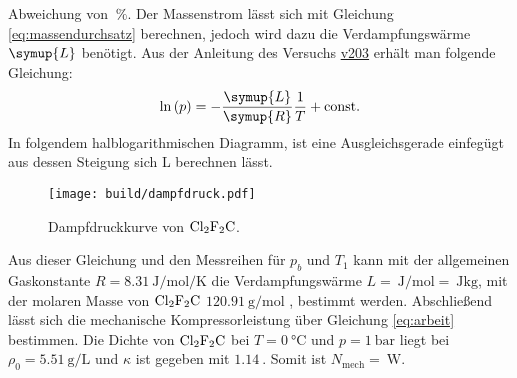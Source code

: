 Abweichung von $\SI{}{\percent}$.
%
Der Massenstrom lässt sich mit Gleichung \eqref{eq:massendurchsatz} berechnen, jedoch wird dazu die Verdampfungswärme 
$\symup{L}$ benötigt.
Aus der Anleitung des Versuchs \href{http://129.217.224.2/HOMEPAGE/PHYSIKER/BACHELOR/AP/SKRIPT/V203.pdf}{v203} erhält man 
folgende Gleichung:
\begin{equation}
    \ln \left(p\right) = -\frac{\symup{L}}{\symup{R}} \frac{1}{T} + \text{const.}
\end{equation}
In folgendem halblogarithmischen Diagramm, ist eine Ausgleichsgerade einfegügt aus dessen Steigung sich L berechnen lässt.
\begin{figure}[H]
\centering
\texttt{[image: build/dampfdruck.pdf]}
\caption{Dampfdruckkurve von $\ce{Cl2F2C}$.}
\end{figure}
%
Aus dieser Gleichung und den Messreihen für $p_b$ und $T_1$ kann mit der allgemeinen Gaskonstante $R=\SI{8.31}{\joule\per\mole\per\kelvin}$
die Verdampfungswärme $L=\SI{}{\joule\per\mole}=\SI{}{\joule\kilogram}$, mit der molaren Masse von $\ce{Cl2F2C}$ 
%
$\SI{120.91}{\gram\per\mole}$ \cite{molar}, bestimmt werden.
Abschließend lässt sich die mechanische Kompressorleistung über Gleichung \eqref{eq:arbeit} bestimmen.
Die Dichte von $\ce{Cl2F2C}$ bei $T=\SI{0}{\celsius}$ und $p=\SI{1}{\bar}$ liegt bei $\rho_0=\SI{5.51}{\gram\per\liter}$ und 
$\kappa$ ist gegeben mit $\SI{1.14}{}$.
Somit ist $N_\text{mech}=\SI{}{\watt}$.
%
